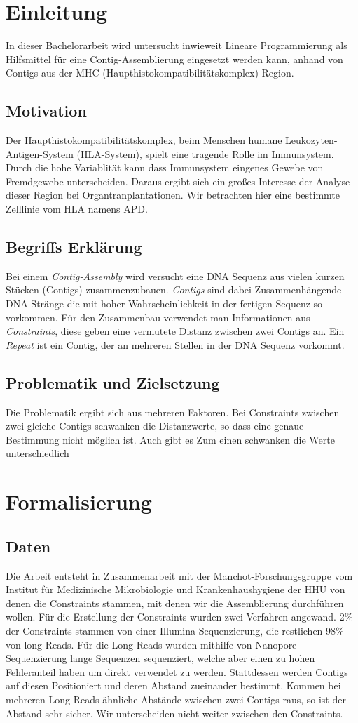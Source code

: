 \section{Einleitung}\raggedbottom 

In dieser Bachelorarbeit wird untersucht inwieweit Lineare Programmierung als Hilfsmittel für eine Contig-Assemblierung eingesetzt werden kann, anhand von Contigs aus der MHC (Haupthistokompatibilitätskomplex) Region.
\subsection{Motivation}
Der Haupthistokompatibilitätskomplex, beim Menschen humane Leukozyten-Antigen-System (HLA-System), spielt eine tragende Rolle im Immunsystem. Durch die hohe Variablität kann dass Immunsystem eingenes Gewebe von Fremdgewebe unterscheiden. Daraus ergibt sich ein großes Interesse der Analyse dieser Region bei Organtranplantationen. Wir betrachten hier eine bestimmte Zelllinie vom HLA namens APD.
\subsection{Begriffs Erklärung}
Bei einem \emph{Contig-Assembly} wird versucht eine DNA Sequenz aus vielen kurzen Stücken (Contigs) zusammenzubauen. \emph{Contigs} sind dabei Zusammenhängende DNA-Stränge die mit hoher Wahrscheinlichkeit in der fertigen Sequenz so vorkommen. Für den Zusammenbau verwendet man Informationen aus \emph{Constraints}, diese geben eine vermutete Distanz zwischen zwei Contigs an.
Ein \emph{Repeat} ist ein Contig, der an mehreren Stellen in der DNA Sequenz vorkommt.
\subsection{Problematik und Zielsetzung}
Die Problematik ergibt sich aus mehreren Faktoren. Bei Constraints zwischen zwei gleiche Contigs schwanken die Distanzwerte, so dass eine genaue Bestimmung nicht möglich ist. Auch gibt es 
Zum einen schwanken die Werte unterschiedlich


\section{Formalisierung}\raggedbottom 
\subsection{Daten}
Die Arbeit entsteht in Zusammenarbeit mit der Manchot-Forschungsgruppe vom Institut für Medizinische Mikrobiologie und Krankenhaushygiene der HHU von denen die Constraints stammen, mit denen wir die Assemblierung durchführen wollen. Für die Erstellung der Constraints wurden zwei Verfahren angewand. 2\% der Constraints stammen von einer Illumina-Sequenzierung, die restlichen 98\% von long-Reads. Für die Long-Reads wurden mithilfe von Nanopore-Sequenzierung lange Sequenzen sequenziert, welche aber einen zu hohen Fehleranteil haben um direkt verwendet zu werden. Stattdessen werden Contigs auf diesen Positioniert und deren Abstand zueinander bestimmt.
Kommen bei mehreren Long-Reads ähnliche Abstände zwischen zwei Contigs raus, so ist der Abstand sehr sicher. Wir unterscheiden nicht weiter zwischen den Constraints.
